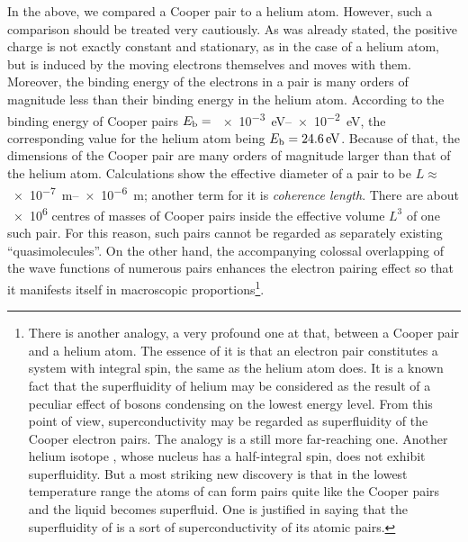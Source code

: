 In the above, we compared a Cooper pair to a helium atom. However, such a comparison should be treated very cautiously. As was already stated, the positive charge is not exactly constant and stationary, as in the case of a helium atom, but is induced by the moving electrons themselves and moves with them. Moreover, the binding energy of the electrons in a pair is many orders of magnitude less than their binding energy in the helium atom. According to  the binding energy of Cooper pairs $E_{\text{b}}=$ \SIrange{e-3}{e-2}{\electronvolt}, the corresponding value for the helium atom being  $E_{\text{b}}=\SI{24.6}{\electronvolt}$. Because
of that, the dimensions of the Cooper pair are many orders of magnitude larger than that of the helium atom. Calculations show the effective diameter of a pair to be $L\approx$ \SIrange{e-7}{e-6}{\metre}; another term for it is \textit{coherence length}. There are about \num{e6} centres of masses of Cooper pairs inside the effective volume $L^3$ of one such pair. For this reason, such pairs cannot be regarded as separately existing ``quasimolecules''. On the other hand, the accompanying colossal overlapping of the wave functions of numerous pairs enhances the electron pairing effect so that it manifests itself in macroscopic proportions\footnote{There is another analogy, a very profound one at that, between a Cooper pair and a helium atom. The essence of it is that an electron pair constitutes a system with integral spin, the same as the helium atom  does. It is a known fact that the superfluidity of helium may be considered as the result of a peculiar effect of bosons condensing on the lowest energy level. From this point of view,
superconductivity may be regarded as superfluidity of the Cooper electron pairs. The analogy is a still more far-reaching one. Another helium isotope , whose nucleus has a half-integral spin, does not exhibit superfluidity. But a most striking new discovery is that in the lowest temperature range the atoms of  can form pairs quite like the Cooper pairs and the liquid becomes superfluid. One is justified in saying that the superfluidity of  is a sort of superconductivity of its atomic pairs.}.

